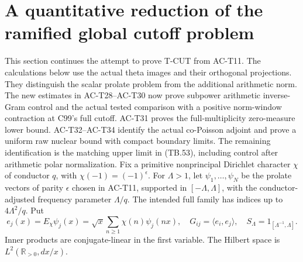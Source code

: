 \section{A quantitative reduction of the ramified global cutoff problem}
\label{sec:ACcutoffbridge}

This section continues the attempt to prove T-CUT from AC-T11.
The calculations below use the actual theta images and their
orthogonal projections.  They distinguish the scalar prolate
problem from the additional arithmetic norm.
The new estimates in AC-T28--AC-T30 now prove subpower
arithmetic inverse-Gram control and the actual tested
comparison with a positive norm-window contraction at
C99's full cutoff.  AC-T31 proves the full-multiplicity
zero-measure lower bound.  AC-T32--AC-T34 identify the
actual co-Poisson adjoint and prove a uniform raw nuclear
bound with compact boundary limits.  The remaining
identification is the matching upper limit in (TB.53),
including control after arithmetic polar normalization.
Fix a primitive nonprincipal Dirichlet character \(\chi\) of
conductor \(q\), with \(\chi(-1)=(-1)^\epsilon\).
For \(\Lambda>1\), let \(\psi_1,\ldots,\psi_N\) be the prolate
vectors of parity \(\epsilon\) chosen in AC-T11, supported in
\([-\Lambda,\Lambda]\), with the conductor-adjusted frequency
parameter \(\Lambda/q\).  The intended full family has indices
up to \(4\Lambda^2/q\).
Put
\[
 e_j(x)=E_\chi\psi_j(x)
   =\sqrt{x}\sum_{n\geq1}\chi(n)\psi_j(nx),\quad
 G_{ij}=\langle e_i,e_j\rangle,\quad
 S_\Lambda=1_{[\Lambda^{-1},\Lambda]}.
\]
Inner products are conjugate-linear in the first variable.
The Hilbert space is \(L^2(\mathbb R_{>0},dx/x)\).


